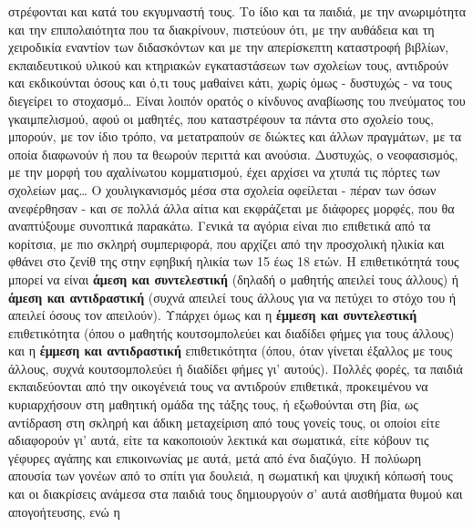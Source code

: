 \documentclass[12pt,a4paper]{book}
\begin{document}
στρέφονται και κατά του εκγυμναστή τους. Το ίδιο και τα παιδιά,  με την
ανωριμότητα και την επιπολαιότητα που τα διακρίνουν, πιστεύουν ότι, με την
αυθάδεια και τη χειροδικία εναντίον των διδασκόντων και με την απερίσκεπτη
καταστροφή βιβλίων, εκπαιδευτικού υλικού και κτηριακών εγκαταστάσεων των
σχολείων τους, αντιδρούν και εκδικούνται όσους και ό,τι τους μαθαίνει κάτι,
χωρίς όμως - δυστυχώς - να τους διεγείρει το στοχασμό\ldots\vspace{6 mm} Είναι
λοιπόν ορατός ο κίνδυνος αναβίωσης του πνεύματος του γκαιμπελισμού, αφού οι μαθητές, που
καταστρέφουν τα πάντα στο σχολείο τους, μπορούν, με τον ίδιο τρόπο, να
μετατραπούν σε διώκτες και άλλων πραγμάτων,  με τα οποία διαφωνούν ή που τα
θεωρούν περιττά και ανούσια. Δυστυχώς, ο νεοφασισμός, με την μορφή του
αχαλίνωτου κομματισμού, έχει αρχίσει να χτυπά τις πόρτες των σχολείων
μας\ldots\vspace{6 mm}
\newline\setlength{\parindent}{40pt}\indent Ο χουλιγκανισμός μέσα στα σχολεία
οφείλεται - πέραν των όσων ανεφέρθησαν - και σε πολλά άλλα αίτια και εκφράζεται
με διάφορες μορφές, που θα αναπτύξουμε συνοπτικά παρακάτω. Γενικά τα αγόρια
είναι πιο επιθετικά από τα κορίτσια, με πιο σκληρή συμπεριφορά, που αρχίζει από
την προσχολική ηλικία και φθάνει στο ζενίθ της στην εφηβική ηλικία των \num{15}
έως \num{18} ετών. Η επιθετικότητά τους μπορεί να είναι \textbf{άμεση και
συντελεστική} (δηλαδή ο μαθητής απειλεί τους άλλους) ή \textbf{άμεση και αντιδραστική} (συχνά
απειλεί τους άλλους για να πετύχει το στόχο του ή απειλεί όσους τον απειλούν).
Υπάρχει όμως και η \textbf{έμμεση και συντελεστική} επιθετικότητα (όπου ο
μαθητής κουτσομπολεύει και διαδίδει φήμες για τους άλλους) και η \textbf{έμμεση
και αντιδραστική} επιθετικότητα (όπου, όταν γίνεται έξαλλος με τους άλλους,
συχνά κουτσομπολεύει ή διαδίδει φήμες γι' αυτούς).
\newline\setlength{\parindent}{40pt}\indent Πολλές φορές, τα παιδιά
εκπαιδεύονται από την οικογένειά τους να αντιδρούν επιθετικά, προκειμένου να
κυριαρχήσουν στη μαθητική ομάδα της τάξης τους, ή εξωθούνται στη βία, ως
αντίδραση στη σκληρή και άδικη μεταχείριση από τους γονείς τους, οι οποίοι είτε
αδιαφορούν γι' αυτά, είτε τα κακοποιούν λεκτικά και σωματικά, είτε κόβουν τις
γέφυρες αγάπης και επικοινωνίας με αυτά, μετά από ένα διαζύγιο.
\newline\setlength{\parindent}{40pt}\indent Η πολύωρη απουσία των γονέων από το
σπίτι για δουλειά, η σωματική και ψυχική κόπωσή τους και οι διακρίσεις ανάμεσα
στα παιδιά τους δημιουργούν σ' αυτά αισθήματα θυμού και απογοήτευσης, ενώ η
\end{document}
